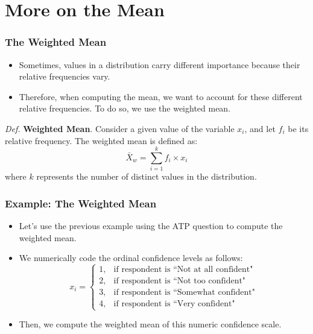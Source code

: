 \documentclass[handout]{beamer} %
\begin{document}
\section{More on the Mean}

\begin{frame}
\frametitle{The Weighted Mean}
\begin{itemize}
    \item Sometimes, values in a distribution carry different importance because their relative frequencies vary.
    \item Therefore, when computing the mean, we want to account for these different relative frequencies. To do so, we use the weighted mean.
    \vspace{1em}
\end{itemize}
\emph{Def.} \textbf{Weighted Mean}.
Consider a given value of the variable \( x_i \), and let \( f_i \) be its relative frequency. The weighted mean is defined as:
\begin{equation*}
\bar{X}_w = \sum_{i=1}^{k} f_i \times x_i
\end{equation*}
where \( k \) represents the number of distinct values in the distribution.
\end{frame}


\begin{frame}
\frametitle{Example: The Weighted Mean}
\begin{itemize}
    \item Let’s use the previous example using the ATP question to compute the weighted mean.
    \item We numerically code the ordinal confidence levels as follows:
    \[
    x_i =
    \begin{cases}
        1, & \text{if respondent is ``Not at all confident"} \\
        2, & \text{if respondent is ``Not too confident"} \\
        3, & \text{if respondent is ``Somewhat confident"} \\
        4, & \text{if respondent is ``Very confident"}
    \end{cases}
    \]
    \item Then, we compute the weighted mean of this numeric confidence scale.
\end{itemize}
\end{frame}
\end{document}
